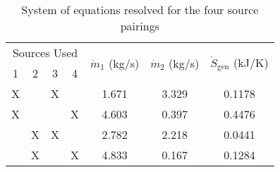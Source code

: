 \begin{table}[H]
\begin{center}

\caption{\small System of equations resolved for the four source pairings}

\vspace{5mm}

\begin{tabular}{ccccccc}

\toprule

\multicolumn{4}{c}{Sources Used} 
& \multirow{2}{*}{$\dot{m}_1$ (kg/s)} 
& \multirow{2}{*}{$\dot{m}_2$ (kg/s)} 
& \multirow{2}{*}{$\dot{S}_{\text{gen}}$ (kJ/K)} \\

1 & 2 & 3 & 4 &&& \\

\midrule

X&&X&& 1.671 & 3.329 & 0.1178 \\
X&&&X& 4.603 & 0.397 & 0.4476 \\
&X&X&& 2.782 & 2.218 & 0.0441 \\
&X&&X& 4.833 & 0.167 & 0.1284 \\

\bottomrule

\end{tabular}
\end{center}
\end{table}